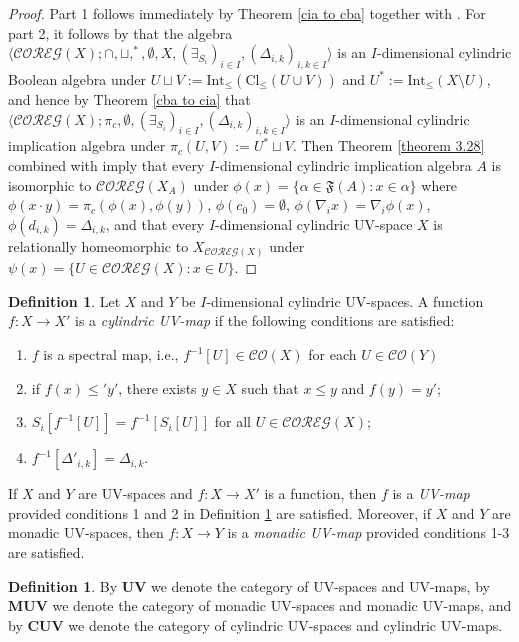 \documentclass[reqno]{amsart}
\theoremstyle{plain}
\theoremstyle{definition}
\newtheorem{definition}[theorem]{Definition}
\begin{document}
\begin{proof}
Part 1 follows immediately by Theorem \ref{cia to cba} together with \cite[Lemma 7.5(1)]{mcdonald2}. For part 2, it follows by \cite[Lemma 7.5(2)]{mcdonald2} that the algebra $\langle\mathcal{COREG}(X);\cap,\sqcup,^*,\emptyset,X,(\exists_{S_i})_{i\in I},(\Delta_{i,k})_{i,k\in I}\rangle$ is an $I$-dimensional cylindric Boolean algebra under $U\sqcup V:=\text{Int}_{\leqslant}(\text{Cl}_{\leqslant}(U\cup V))$ and $U^*:=\text{Int}_{\leqslant}(X\setminus U)$, and hence by Theorem \ref{cba to cia} that $\langle\mathcal{COREG}(X);\pi_c,\emptyset,(\exists_{S_i})_{i\in I},(\Delta_{i,k})_{i,k\in I}\rangle$ is an $I$-dimensional cylindric implication algebra under $\pi_c(U,V):=U^*\sqcup V$. Then Theorem \ref{theorem 3.28} combined with \cite[Theorem 7.7]{mcdonald2} imply that every $I$-dimensional cylindric implication algebra $A$ is isomorphic to $\mathcal{COREG}(X_A)$ under $\phi(x)=\{\alpha\in\mathfrak{F}(A):x\in\alpha\}$ where $\phi(x\cdot y)=\pi_c(\phi(x),\phi(y))$, $\phi(c_0)=\emptyset$, $\phi(\nabla_ix)=\nabla_i\phi(x)$, $\phi(d_{i,k})=\Delta_{i,k}$, 
and that every $I$-dimensional cylindric UV-space $X$ is relationally homeomorphic to $X_{\mathcal{COREG}(X)}$ under $\psi(x)=\{U\in\mathcal{COREG}(X):x\in U\}$.   
\end{proof}
\begin{definition}\label{uv map}
    Let $X$ and $Y$ be $I$-dimensional cylindric UV-spaces. A function $f\colon X\to X'$ is a \emph{cylindric UV-map} if the following conditions are satisfied: 
    \begin{enumerate}
        \item $f$ is a spectral map, i.e., $f^{-1}[U]\in\mathcal{CO}(X)$ for each $U\in\mathcal{CO}(Y)$ 
        \item if $f(x)\leqslant' y'$, there exists $y\in X$ such that $x\leqslant y$ and $f(y)=y'$; 
        \item $S_{i}[f^{-1}[U]]=f^{-1}[S_{i}[U]]$ for all $U\in\mathcal{COREG}(X)$; 
   \item $f^{-1}[\Delta'_{i,k}]=\Delta_{i,k}$. 
    \end{enumerate}
\end{definition}
 


If $X$ and $Y$ are UV-spaces and $f\colon X\to X'$ is a function, then $f$ is a \emph{UV-map} provided conditions 1 and 2 in Definition \ref{uv map} are satisfied. Moreover, if $X$ and $Y$  are monadic UV-spaces, then $f\colon X\to Y$ is a \emph{monadic UV-map} provided conditions 1-3 are satisfied.
\begin{definition}
   By $\mathbf{UV}$ we denote the category of UV-spaces and UV-maps, by $\mathbf{MUV}$ we denote the category of monadic UV-spaces and monadic UV-maps, and by $\mathbf{CUV}$ we denote the category of cylindric UV-spaces and cylindric UV-maps.  
\end{definition}
\end{document}
